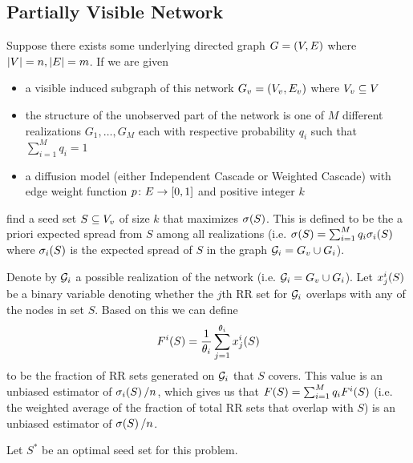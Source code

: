 \subsection{Partially Visible Network}
\begin{problem}[PV-IM]
    Suppose there exists some underlying directed graph $G = \lrp{V, E}$ where $\abs{V} = n, \abs{E} = m$. If we are given
    \begin{itemize}[label=--]
        \itemsep0em 
        \item a visible induced subgraph of this network $G_v = \lrp{V_v, E_v}$ where $V_v \sse V$
        \item the structure of the unobserved part of the network is one of $M$ different realizations $G_1, \ldots, G_M$
        each with respective probability $q_i$ such that $\sum_{i=1}^{M} q_i = 1$ 
        \item a diffusion model (either Independent Cascade or Weighted Cascade) with edge weight function $p \colon E \rightarrow \lrb{0, 1}$ and positive integer $k$
    \end{itemize}  
    find a seed set $S \sse V_v$ of size $k$ that maximizes $\infl{S}$. This is defined to be the a priori expected spread from $S$ among all 
    realizations (i.e.\! $\infl{S} = \sum_{i=1}^{M} q_i \f[\sigma_i]{S}$ where $\f[\sigma_i]{S}$ is the expected spread of $S$ in the graph $\calG_i = G_v \cup G_i$). 
\end{problem}


Denote by $\calG_i$ a possible realization of the network (i.e.\!  $\calG_i = G_v \cup G_i$). Let $\f[x_j^i]{S}$ be a binary variable 
denoting whether the $j$th RR set for $\calG_i$ overlaps with any of the nodes in set $S$. Based on this we can define 
\begin{equation*}
    \f[F^i]{S} = \frac{1}{\theta_i} \sum_{j=1}^{\theta_i} \f[x_j^i]{S}
\end{equation*}
to be the fraction of RR sets generated on $\calG_i$ that $S$ covers. This value is an unbiased estimator of $\f[\sigma_i]{S} / n$, which gives us that 
$\f[F]{S} = \sum_{i=1}^{M} q_i \f[F^i]{S}$ (i.e.\! the weighted average of the fraction of total RR sets that overlap with $S$) is an unbiased estimator of 
$\f[\sigma]{S} / n$. 
 

Let $S^{\ast}$ be an optimal seed set for this problem. 


